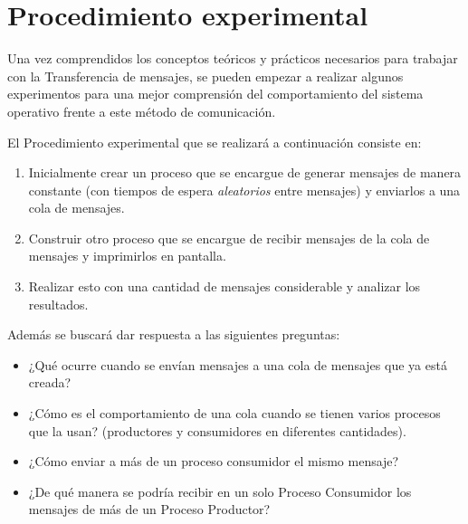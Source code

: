 \section{Procedimiento experimental}\label{sec:ProcedimientoExperimental}
Una vez comprendidos los conceptos teóricos y prácticos necesarios para trabajar con la Transferencia de mensajes, se pueden empezar a realizar algunos experimentos para una mejor comprensión del comportamiento del sistema operativo frente a este método de comunicación.

El Procedimiento experimental que se realizará a continuación consiste en:
\begin{enumerate}
    \item Inicialmente crear un proceso que se encargue de generar mensajes de manera constante (con tiempos de espera \textit{aleatorios} entre mensajes) y enviarlos a una cola de mensajes.
    \item Construir otro proceso que se encargue de recibir mensajes de la cola de mensajes y imprimirlos en pantalla.
    \item Realizar esto con una cantidad de mensajes considerable y analizar los resultados.
\end{enumerate}

Además se buscará dar respuesta a las siguientes preguntas:
\begin{itemize}
    \item ¿Qué ocurre cuando se envían mensajes a una cola de mensajes que ya está creada?
    \item ¿Cómo es el comportamiento de una cola cuando se tienen varios procesos que la usan? (productores y consumidores en diferentes cantidades).
    \item ¿Cómo enviar a más de un proceso consumidor el mismo mensaje?
    \item ¿De qué manera se podría recibir en un solo Proceso Consumidor los mensajes de más de un Proceso Productor?
\end{itemize}
